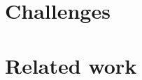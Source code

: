 \documentclass[letterpaper]{phd-thesis}
\begin{document}
\chapter{Challenges}\label{sec:chall}


\chapter{Related work}\label{sec:related}




\appendix


%


\backmatter

\printindex
\end{document}

